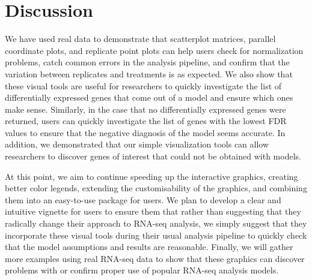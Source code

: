 \documentclass[referee]{biom}
\begin{document}
\section{Discussion}
\label{s:discuss}

We have used real data to demonstrate that scatterplot matrices, parallel coordinate plots, and replicate point plots can help users check for normalization problems, catch common errors in the analysis pipeline, and confirm that the variation between replicates and treatments is as expected. We also show that these visual tools are useful for researchers to quickly investigate the list of differentially expressed genes that come out of a model and ensure which ones make sense. Similarly, in the case that no differentially expressed genes were returned, users can quickly investigate the list of genes with the lowest FDR values to ensure that the negative diagnosis of the model seems accurate. In addition, we demonstrated that our simple visualization tools can allow researchers to discover genes of interest that could not be obtained with models.

At this point, we aim to continue speeding up the interactive graphics, creating better color legends, extending the customisability of the graphics, and combining them into an easy-to-use package for users. We plan to develop a clear and intuitive vignette for users to ensure them that rather than suggesting that they radically change their approach to RNA-seq analysis, we simply suggest that they incorporate these visual tools during their usual analysis pipeline to quickly check that the model assumptions and results are reasonable. Finally, we will gather more examples using real RNA-seq data to show that these graphics can discover problems with or confirm proper use of popular RNA-seq analysis models.



\backmatter



\end{document}
